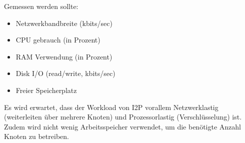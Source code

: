 Gemessen werden sollte:

\begin{itemize}
    \item Netzwerkbandbreite (kbits/sec)
    \item CPU gebrauch (in Prozent)
    \item RAM Verwendung (in Prozent)
    \item Disk I/O (read/write, kbits/sec)
    \item Freier Speicherplatz
\end{itemize}


Es wird erwartet, dass der Workload von I2P vorallem Netzwerklastig (weiterleiten über mehrere Knoten) und Prozessorlastig (Verschlüsselung) ist.
Zudem wird nicht wenig Arbeitsspeicher verwendet, um die benötigte Anzahl Knoten zu betreiben.
